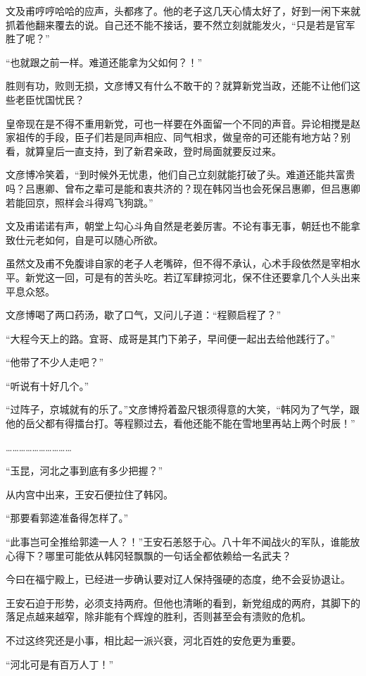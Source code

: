 文及甫哼哼哈哈的应声，头都疼了。他的老子这几天心情太好了，好到一闲下来就抓着他翻来覆去的说。自己还不能不接话，要不然立刻就能发火，“只是若是官军胜了呢？”

“也就跟之前一样。难道还能拿为父如何？！”

胜则有功，败则无损，文彦博又有什么不敢干的？就算新党当政，还能不让他们这些老臣忧国忧民？

皇帝现在是不得不重用新党，可也一样要在外面留一个不同的声音。异论相搅是赵家祖传的手段，臣子们若是同声相应、同气相求，做皇帝的可还能有地方站？别看，就算皇后一直支持，到了新君亲政，登时局面就要反过来。

文彦博冷笑着，“到时候外无忧患，他们自己立刻就能打破了头。难道还能共富贵吗？吕惠卿、曾布之辈可是能和衷共济的？现在韩冈当也会死保吕惠卿，但吕惠卿若能回京，照样会斗得鸡飞狗跳。”

文及甫诺诺有声，朝堂上勾心斗角自然是老姜厉害。不论有事无事，朝廷也不能拿致仕元老如何，自是可以随心所欲。

虽然文及甫不免腹诽自家的老子人老嘴碎，但不得不承认，心术手段依然是宰相水平。新党这一回，可是有的苦头吃。若辽军肆掠河北，保不住还要拿几个人头出来平息众怒。

文彦博喝了两口药汤，歇了口气，又问儿子道：“程颢启程了？”

“大程今天上的路。宜哥、成哥是其门下弟子，早间便一起出去给他践行了。”

“他带了不少人走吧？”

“听说有十好几个。”

“过阵子，京城就有的乐了。”文彦博捋着盈尺银须得意的大笑，“韩冈为了气学，跟他的岳父都有得擂台打。等程颢过去，看他还能不能在雪地里再站上两个时辰！”

…………………………

“玉昆，河北之事到底有多少把握？”

从内宫中出来，王安石便拉住了韩冈。

“那要看郭逵准备得怎样了。”

“此事岂可全推给郭逵一人？！”王安石恙怒于心。八十年不闻战火的军队，谁能放心得下？哪里可能依从韩冈轻飘飘的一句话全都依赖给一名武夫？

今曰在福宁殿上，已经进一步确认要对辽人保持强硬的态度，绝不会妥协退让。

王安石迫于形势，必须支持两府。但他也清晰的看到，新党组成的两府，其脚下的落足点越来越窄，除非能有个辉煌的胜利，否则甚至会有溃败的危机。

不过这终究还是小事，相比起一派兴衰，河北百姓的安危更为重要。

“河北可是有百万人丁！”

